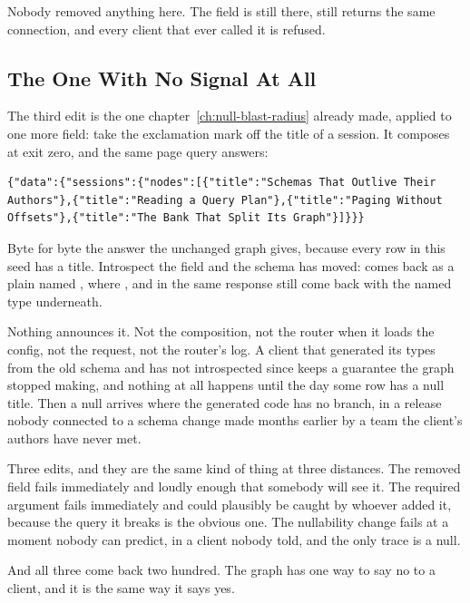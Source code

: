 %
Nobody removed anything here. The field is still there, still returns the same
connection, and every client that ever called it is refused.

\subsection{The One With No Signal At All}

%
The third edit is the one chapter~\ref{ch:null-blast-radius} already made,
applied to one more field: take the exclamation mark off the title of a
session. It composes at exit zero, and the same page query answers:

\begin{verbatim}
{"data":{"sessions":{"nodes":[{"title":"Schemas That Outlive Their Authors"},{"title":"Reading a Query Plan"},{"title":"Paging Without Offsets"},{"title":"The Bank That Split Its Graph"}]}}}
\end{verbatim}

%
Byte for byte the answer the unchanged graph gives, because every row in this
seed has a title. Introspect the field and the schema has moved: 
comes back as a plain  named , where ,
 and  in the same response still come back
 with the named type underneath.

%
Nothing announces it. Not the composition, not the router when it loads the
config, not the request, not the router's log. A client that generated its
types from the old schema and has not introspected since keeps a guarantee the
graph stopped making, and nothing at all happens until the day some row has a
null title. Then a null arrives where the generated code has no branch, in a
release nobody connected to a schema change made months earlier by a team the
client's authors have never met.

%
Three edits, and they are the same kind of thing at three distances. The
removed field fails immediately and loudly enough that somebody will see it.
The required argument fails immediately and could plausibly be caught by
whoever added it, because the query it breaks is the obvious one. The
nullability change fails at a moment nobody can predict, in a client nobody
told, and the only trace is a null.

%
And all three come back two hundred. The graph has one way to say no to a
client, and it is the same way it says yes.
%
